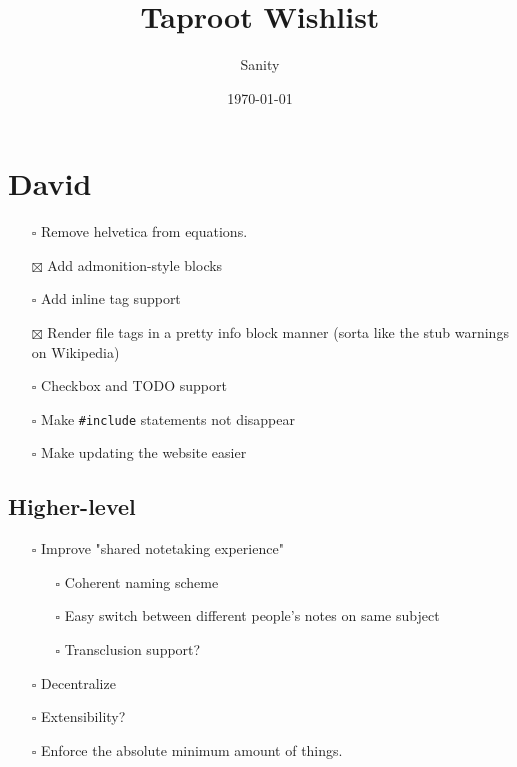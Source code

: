 \documentclass[letterpaper]{article}
\author{Sanity}
\date{\today}
\title{Taproot Wishlist}
\renewcommand{\tableofcontents}{}
\begin{document}
\tableofcontents


\section{David}
\label{sec:org9b3d920}
\begin{itemize}
\item[{$\square$}] Remove helvetica from equations.
\item[{$\boxtimes$}] Add admonition-style blocks
\item[{$\square$}] Add inline tag support
\item[{$\boxtimes$}] Render file tags in a pretty info block manner (sorta like the stub warnings on Wikipedia)
\item[{$\square$}] Checkbox and TODO support
\item[{$\square$}] Make \texttt{\#include} statements not disappear
\item[{$\square$}] Make updating the website easier
\end{itemize}
\subsection{Higher-level}
\label{sec:org457e286}
\begin{itemize}
\item[{$\square$}] Improve "shared notetaking experience"
\begin{itemize}
\item[{$\square$}] Coherent naming scheme
\item[{$\square$}] Easy switch between different people's notes on same subject
\item[{$\square$}] Transclusion support?
\end{itemize}
\item[{$\square$}] Decentralize
\item[{$\square$}] Extensibility?
\item[{$\square$}] Enforce the absolute minimum amount of things.
\end{itemize}
\end{document}
